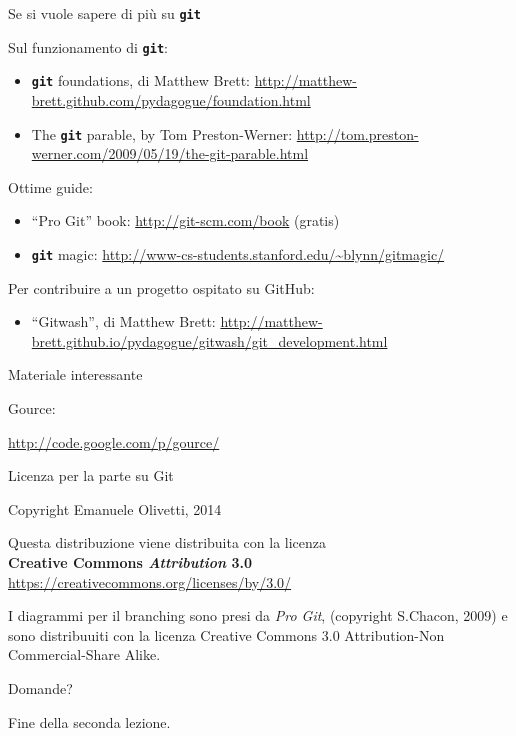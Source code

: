 \documentclass{beamer}
\newcommand{\git}{\texttt{\textbf{git}}\xspace}
\begin{document}
\begin{frame}{\centerline{Se si vuole sapere di pi\`{u} su \git}}
  Sul funzionamento di \git :
  \begin{itemize}
  \item \git foundations, di Matthew Brett:
    \small
    \url{http://matthew-brett.github.com/pydagogue/foundation.html}
  \item  The \git parable, by Tom Preston-Werner:
    \small
  \url{http://tom.preston-werner.com/2009/05/19/the-git-parable.html}
  \end{itemize}
  Ottime guide:
  \begin{itemize}
  \item ``Pro Git'' book: \url{http://git-scm.com/book} (gratis)
  \item \git magic: \url{http://www-cs-students.stanford.edu/~blynn/gitmagic/}
  \end{itemize}
  Per contribuire a un progetto ospitato su  GitHub:
  \begin{itemize}
  \item ``Gitwash'', di Matthew Brett:
    \small
    \url{http://matthew-brett.github.io/pydagogue/gitwash/git_development.html}
  \end{itemize}
\end{frame}

\begin{frame}{\centerline{Materiale interessante}}
Gource:
  \begin{center}
    \url{http://code.google.com/p/gource/}
  \end{center}
\end{frame}


\begin{frame}{\centerline{Licenza per la parte su Git}}
  \begin{center}
    Copyright Emanuele Olivetti, 2014
  \end{center}
  \vspace{1em}
  \begin{center}
    Questa distribuzione viene distribuita con la licenza\\
    \textbf{Creative Commons \emph{Attribution} 3.0}\\
    \url{https://creativecommons.org/licenses/by/3.0/}
  \end{center}
  \vspace{1em}
  \begin{center}\small
    I diagrammi per il branching sono presi da \emph{Pro
      Git}, (copyright S.Chacon, 2009) e sono distribuuiti con la licenza Creative Commons 3.0 Attribution-Non Commercial-Share Alike.
  \end{center}
\end{frame}


\begin{frame}
{\centerline{Domande?}}
\vspace{1cm}
\begin{center}
    \LARGE{Fine della seconda lezione.}
\end{center}

\end{frame}
\end{document}
